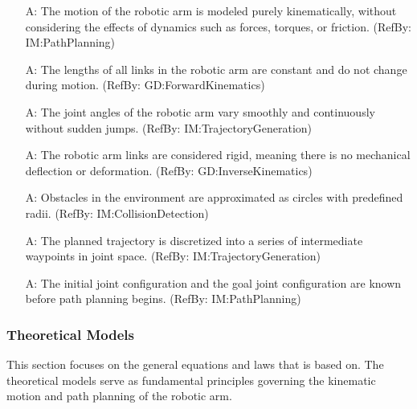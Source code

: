 \documentclass[12pt]{article}
\newcounter{assumpnum} %
\begin{document}
\begin{itemize}

  \item[A\refstepcounter{assumpnum}\theassumpnum \label{A_KinematicMotionOnly}:] 
  The motion of the robotic arm is modeled purely kinematically, without considering the effects of dynamics such as forces, torques, or friction. (RefBy: IM:PathPlanning)

\item[A\refstepcounter{assumpnum}\theassumpnum \label{A_LinkLengthsConstant}:] 
  The lengths of all links in the robotic arm are constant and do not change during motion. (RefBy: GD:ForwardKinematics)

\item[A\refstepcounter{assumpnum}\theassumpnum \label{A_JointMotionContinuous}:] 
  The joint angles of the robotic arm vary smoothly and continuously without sudden jumps. (RefBy: IM:TrajectoryGeneration)

\item[A\refstepcounter{assumpnum}\theassumpnum \label{A_NoMechanicalDeflection}:] 
  The robotic arm links are considered rigid, meaning there is no mechanical deflection or deformation. (RefBy: GD:InverseKinematics)

\item[A\refstepcounter{assumpnum}\theassumpnum \label{A_ObstacleShapeCircular}:] 
  Obstacles in the environment are approximated as circles with predefined radii. (RefBy: IM:CollisionDetection)

\item[A\refstepcounter{assumpnum}\theassumpnum \label{A_TrajectoryDiscretized}:] 
  The planned trajectory is discretized into a series of intermediate waypoints in joint space. (RefBy: IM:TrajectoryGeneration)

\item[A\refstepcounter{assumpnum}\theassumpnum \label{A_InitialAndGoalConfigurationsKnown}:] 
  The initial joint configuration and the goal joint configuration are known before path planning begins. (RefBy: IM:PathPlanning)

\end{itemize}

\subsubsection{Theoretical Models}\label{sec_theoretical}

This section focuses on the general equations and laws that \progname{} is based
on. The theoretical models serve as fundamental principles governing the kinematic motion and path planning of the robotic arm. 
\end{document}
